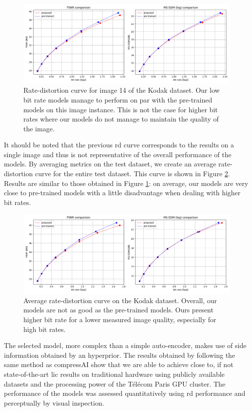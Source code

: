 \begin{figure}
    \centering
    \includegraphics[width=15cm]{img/bdpsnr_rd_kodak_14.png}
    \caption[Rate-distortion curve for image 14 of the Kodak dataset.]{Rate-distortion curve for image 14 of the Kodak dataset. Our low bit rate models manage to perform on par with the pre-trained models on this image instance. This is not the case for higher bit rates where our models do not manage to maintain the quality of the image.}
    \label{bdpsnr_2}
\end{figure}

It should be noted that the previous \acrshort{rd} curve corresponds to the results on a single image and thus is not representative of the overall performance of the models. By averaging metrics on the test dataset, we create an average rate-distortion curve for the entire test dataset. This curve is shown in Figure \ref{bdpsnr_3}. Results are similar to those obtained in Figure \ref{bdpsnr_2}: on average, our models are very close to pre-trained models with a little disadvantage when dealing with higher bit rates.

\begin{figure}
    \centering
    \includegraphics[width=15cm]{img/bdpsnr_rd.png}
    \caption[Average rate-distortion curve on the Kodak dataset.]{Average rate-distortion curve on the Kodak dataset. Overall, our models are not as good as the pre-trained models. Ours present higher bit rate for a lower measured image quality, especially for high bit rates.}
    \label{bdpsnr_3}
\end{figure}

The selected model, more complex than a simple auto-encoder, makes use of side information obtained by an hyperprior. The results obtained by following the same method as compressAI show that we are able to achieve close to, if not state-of-the-art \acrshort{lic} results on traditional hardware using publicly available datasets and the processing power of the Télécom Paris GPU cluster. The performance of the models was assessed quantitatively using \acrshort{rd} performance and perceptually by visual inspection.